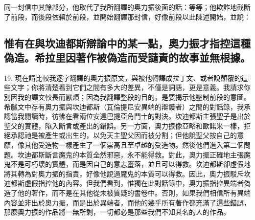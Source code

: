 同一封信中其餘部分，他取代了我所翻譯的奧力振後面的話：等等；他欺詐地截斷了前段，而後段依賴於前段，並開始翻譯那封信，好像前段以此陳述開始，並說：\par

\par


\subsection{惟有在與坎迪都斯辯論中的某一點，奧力振才指控這種偽造。希拉里因著作被偽造而受譴責的故事並無根據。}

19. 現在請比較我逐字翻譯的奧力振原文，與被他轉譯成拉丁文、或者說顛覆的這些文字；你將清楚看到它們之間有多大的差異，不僅是詞語，更是意義。我請求你別因我的譯文較長而厭煩；因為我翻譯整段的目的，是要揭示他壓制前段的意圖。希臘文中存有奧力振與坎迪都斯（瓦倫提尼安異端的辯護者）之間的對話錄，我承認當我閱讀時，彷彿在看兩位安達巴提亞角鬥士的對決。坎迪都斯主張聖子是出於聖父的實體，陷入斷言或產出的錯誤。另一方面，奧力振像亞略和歐諾米一樣，拒絕承認祂是被產生或出生的，以免天主聖父因而被分割；但他說聖父按自己的意願，像其他受造物一樣產生了一個崇高且至卓越的受造物。然後他們進入第二個問題。坎迪都斯斷言魔鬼的本質全然邪惡，永不能得救。對此，奧力振正確地主張魔鬼不是可朽壞的實體，而是因自己的意志墮落，並且可以得救。坎迪都斯卻虛假地將其轉為對奧力振的指責，好像他說過魔鬼的本質可以得救。因此，奧力振駁斥坎迪都斯虛假指控他的內容。但我們看到，惟獨在此對話錄中，奧力振指控異端者偽造了他的著作，而不是在其他從未被質疑的書卷中。否則，如果我們相信所有異端內容並非出於奧力振，而是出於異端者，而他的幾乎所有著作都充滿了這些錯誤，那麼奧力振的作品將一無所剩，一切都必是那些我們不知其名的人的作品。\par

